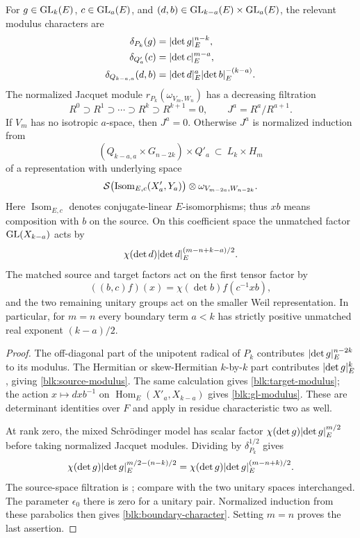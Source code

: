 \begin{lemma}
\label{blk:kudla}
For $g\in\operatorname{GL}_k(E)$, $c\in\operatorname{GL}_a(E)$, and
$(d,b)\in\operatorname{GL}_{k-a}(E)\times\operatorname{GL}_a(E)$, the relevant modulus characters
are
\begin{align}
 \delta_{P_k}(g)&=\lvert\det g\rvert_E^{n-k},
       \label{blk:source-modulus}\\
 \delta_{Q'_a}(c)&=\lvert\det c\rvert_E^{m-a},
       \label{blk:target-modulus}\\
 \delta_{Q_{k-a,a}}(d,b)
   &=\lvert\det d\rvert_E^a\lvert\det b\rvert_E^{-(k-a)}.
       \label{blk:gl-modulus}
\end{align}
The normalized Jacquet module $r_{P_k}(\omega_{V_m,W_n})$ has a
decreasing filtration
\[
 R^0\supset R^1\supset\cdots\supset R^k\supset R^{k+1}=0,
 \qquad J^a=R^a/R^{a+1}.
\]
If $V_m$ has no isotropic $a$-space, then $J^a=0$.  Otherwise $J^a$ is
normalized induction from
\[
 (Q_{k-a,a}\times G_{n-2k})\times Q'_a
   \ \subset\ L_k\times H_m
\]
of a representation with underlying space
\[
 \mathcal S\bigl(\operatorname{Isom}_{E,c}(X'_a,Y_a)\bigr)
       \otimes\omega_{V_{m-2a},W_{n-2k}}.
\]
Here $\operatorname{Isom}_{E,c}$ denotes conjugate-linear $E$-isomorphisms;
thus $xb$ means composition with $b$ on the source.
On this coefficient space the unmatched factor $\operatorname{GL}(X_{k-a})$ acts
by
\begin{equation}
 \chi(\det d)\lvert\det d\rvert_E^{(m-n+k-a)/2}.
 \label{blk:boundary-character}
\end{equation}
The matched source and target factors act on the first tensor factor by
\[
 ((b,c)f)(x)=\chi(\det b)f(c^{-1}xb),
\]
and the two remaining unitary groups act on the smaller Weil
representation.  In particular, for $m=n$ every boundary term $a<k$
has strictly positive unmatched real exponent $(k-a)/2$.
\end{lemma}

\begin{proof}
The off-diagonal part of the unipotent radical of $P_k$ contributes
$\lvert\det g\rvert_E^{n-2k}$ to its modulus.  The Hermitian or skew-Hermitian
$k$-by-$k$ part contributes $\lvert\det g\rvert_E^k$, giving
\eqref{blk:source-modulus}.  The same calculation gives
\eqref{blk:target-modulus}; the action $x\mapsto dxb^{-1}$ on
$\operatorname{Hom}_E(X'_a,X_{k-a})$ gives
\eqref{blk:gl-modulus}.  These are determinant identities over $F$ and
apply in residue characteristic two as well.

At rank zero, the mixed
Schr\"odinger model has scalar factor
$\chi(\det g)\lvert\det g\rvert_E^{m/2}$ before taking normalized Jacquet
modules.  Dividing by $\delta_{P_k}^{1/2}$ gives
\[
 \chi(\det g)\lvert\det g\rvert_E^{m/2-(n-k)/2}
   =\chi(\det g)\lvert\det g\rvert_E^{(m-n+k)/2}.
\]
The source-space filtration is \cite[Lemma~3.1]{GanTakeda}; compare
\cite[Appendix~C.1, Lemma~C.2]{GanIchinoFormal} with the two unitary spaces
interchanged.  The parameter $\epsilon_0$ there is zero for a unitary
pair.  Normalized induction from these parabolics then gives
\eqref{blk:boundary-character}.  Setting $m=n$ proves the last assertion.
\end{proof}

